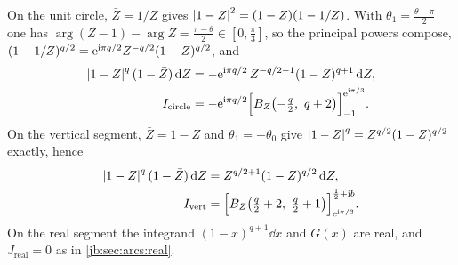 On the unit circle, $\bar Z = 1/Z$ gives ${|1 - Z|}^2 = (1 - Z)(1 - 1/Z)$.
With $\theta_1 = \tfrac{\theta - \pi}{2}$ one has $\arg(Z - 1) - \arg Z = \tfrac{\pi - \theta}{2}
\in [0, \tfrac{\pi}{3}]$, so the principal powers compose, $(1 - 1/Z)^{q/2} = \mathrm{e}^{\mathrm{i} \pi q/2}
Z^{-q/2} (1 - Z)^{q/2}$, and
\begin{equation}
  \label{jb:eq:closure-circle}
  \begin{aligned}
    {|1 - Z|}^{q} \, (1 - \bar Z) \, \mathrm{d} Z
      &
      = - \mathrm{e}^{\mathrm{i} \pi q/2} \, Z^{-q/2 - 1} (1 - Z)^{q + 1} \, \mathrm{d} Z,
    \\
    I_{\text{circle}}
      &
      = - \mathrm{e}^{\mathrm{i} \pi q/2} \Bigl[ B_Z \bigl( - \tfrac{q}{2}, \ q + 2 \bigr) \Bigr]_{-1}^{\mathrm{e}^{\mathrm{i} \pi/3}} .
  \end{aligned}
\end{equation}
On the vertical segment, $\bar Z = 1 - Z$ and $\theta_1 = - \theta_0$ give
${|1 - Z|}^{q} = Z^{q/2} (1 - Z)^{q/2}$ exactly, hence
\begin{equation}
  \label{jb:eq:closure-vert}
  \begin{aligned}
    {|1 - Z|}^{q} \, (1 - \bar Z) \, \mathrm{d} Z
      &
      = Z^{q/2 + 1} (1 - Z)^{q/2} \, \mathrm{d} Z,
    \\
    I_{\text{vert}}
      &
      = \Bigl[ B_Z \bigl( \tfrac{q}{2} + 2, \ \tfrac{q}{2} + 1 \bigr) \Bigr]_{\mathrm{e}^{\mathrm{i} \pi/3}}^{\frac12 + \mathrm{i} b} .
  \end{aligned}
\end{equation}
On the real segment the integrand $(1 - x)^{q + 1} \dd x$ and $G(x)$ are real, and
$J_{\text{real}} = 0$ as in \cref{jb:sec:arcs:real}.

